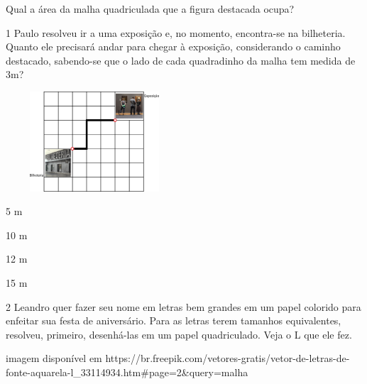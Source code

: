 \begin{multicols}{2}
Qual a área da malha quadriculada que a figura destacada ocupa?




\num{1} Paulo resolveu ir a uma exposição e, no momento, encontra-se na
bilheteria. Quanto ele precisará andar para chegar à exposição,
considerando o caminho destacado, sabendo-se que o lado de cada
quadradinho da malha tem medida de 3m?


\includegraphics[width=2.60897in,height=1.46587in]{media/image61.png}

\begin{minipage}{.5\textwidth}
\begin{escolha}
\item
  5 m
\item
  10 m
\item
  12 m
\item
  15 m
\end{escolha}
\end{minipage}

\num{2} Leandro quer fazer seu nome em letras bem grandes em um papel colorido para enfeitar sua festa de aniversário. Para as letras terem tamanhos equivalentes, resolveu, primeiro, desenhá-las em um papel quadriculado. Veja o L que ele fez.

\Inserir imagem disponível em https://br.freepik.com/vetores-gratis/vetor-de-letras-de-fonte-aquarela-l_33114934.htm#page=2&query=malha%


\end{multicols}
